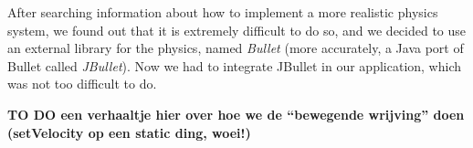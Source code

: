 After searching information about how to implement a more realistic physics system, we found out that it is extremely difficult to do so, and we decided to use an external library for the physics, named \emph{Bullet} (more accurately, a Java port of Bullet called \emph{JBullet}). Now we had to integrate JBullet in our application, which was not too difficult to do.

\textbf{TO DO een verhaaltje hier over hoe we de ``bewegende wrijving'' doen (setVelocity op een static ding, woei!)}